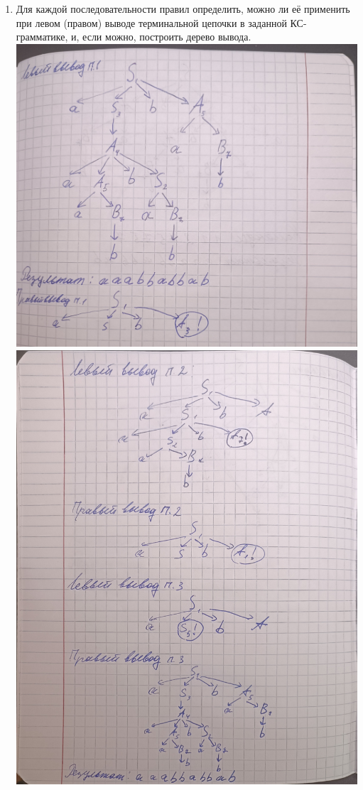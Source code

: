 \documentclass[a4paper,14pt]{extarticle}
\begin{document}
\begin{enumerate}[1.]
  \item Для каждой последовательности правил определить, 
  можно ли её применить при левом (правом) выводе терминальной цепочки 
  в заданной КС-грамматике, и, если можно, построить дерево вывода.\\
  \includegraphics[width=140mm]{task4_1}\\
  \includegraphics[width=140mm]{task4_2}\\

\end{enumerate}
\end{document}
